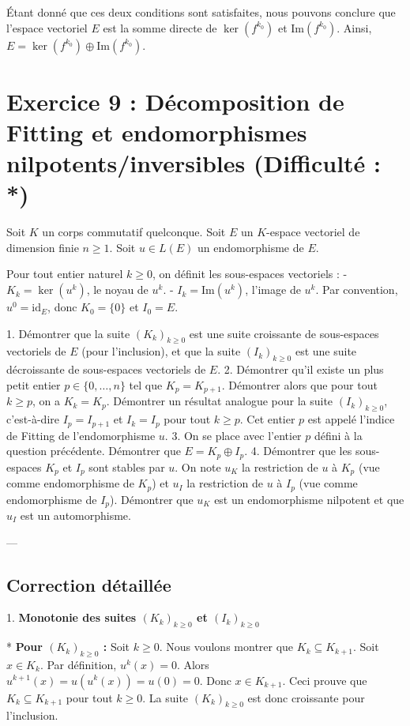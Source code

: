 \documentclass{report}
\begin{document}
        Étant donné que ces deux conditions sont satisfaites, nous pouvons conclure que l'espace vectoriel $E$ est la somme directe de $\ker(f^{k_0})$ et $\text{Im}(f^{k_0})$.
        Ainsi, $E = \ker(f^{k_0}) \oplus \text{Im}(f^{k_0})$.

\newpage
\chapter*{Exercice 9 : Décomposition de Fitting et endomorphismes nilpotents/inversibles (Difficulté : \textbf{}*)}

Soit $K$ un corps commutatif quelconque. Soit $E$ un $K$-espace vectoriel de dimension finie $n \ge 1$.
Soit $u \in L(E)$ un endomorphisme de $E$.

Pour tout entier naturel $k \ge 0$, on définit les sous-espaces vectoriels :
- $K_k = \ker(u^k)$, le noyau de $u^k$.
- $I_k = \mathrm{Im}(u^k)$, l'image de $u^k$.
Par convention, $u^0 = \mathrm{id}_E$, donc $K_0 = \{0\}$ et $I_0 = E$.

1.  Démontrer que la suite $(K_k)_{k \ge 0}$ est une suite croissante de sous-espaces vectoriels de $E$ (pour l'inclusion), et que la suite $(I_k)_{k \ge 0}$ est une suite décroissante de sous-espaces vectoriels de $E$.
2.  Démontrer qu'il existe un plus petit entier $p \in \{0, \dots, n\}$ tel que $K_p = K_{p+1}$. Démontrer alors que pour tout $k \ge p$, on a $K_k = K_p$. Démontrer un résultat analogue pour la suite $(I_k)_{k \ge 0}$, c'est-à-dire $I_p = I_{p+1}$ et $I_k = I_p$ pour tout $k \ge p$. Cet entier $p$ est appelé l'indice de Fitting de l'endomorphisme $u$.
3.  On se place avec l'entier $p$ défini à la question précédente. Démontrer que $E = K_p \oplus I_p$.
4.  Démontrer que les sous-espaces $K_p$ et $I_p$ sont stables par $u$. On note $u_K$ la restriction de $u$ à $K_p$ (vue comme endomorphisme de $K_p$) et $u_I$ la restriction de $u$ à $I_p$ (vue comme endomorphisme de $I_p$). Démontrer que $u_K$ est un endomorphisme nilpotent et que $u_I$ est un automorphisme.

---

\section*{Correction détaillée}

1.  \textbf{Monotonie des suites $(K_k)_{k \ge 0}$ et $(I_k)_{k \ge 0}$}

    *   \textbf{Pour $(K_k)_{k \ge 0}$ :}
        Soit $k \ge 0$. Nous voulons montrer que $K_k \subseteq K_{k+1}$.
        Soit $x \in K_k$. Par définition, $u^k(x) = 0$.
        Alors $u^{k+1}(x) = u(u^k(x)) = u(0) = 0$.
        Donc $x \in K_{k+1}$.
        Ceci prouve que $K_k \subseteq K_{k+1}$ pour tout $k \ge 0$. La suite $(K_k)_{k \ge 0}$ est donc croissante pour l'inclusion.
\end{document}

